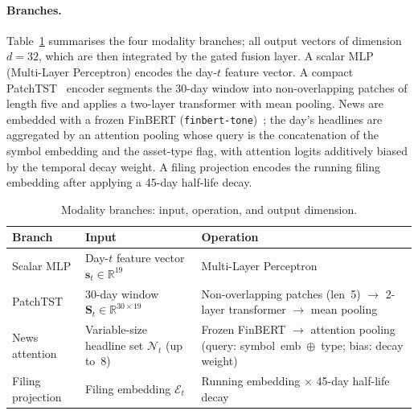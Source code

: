 \documentclass[runningheads]{llncs}
\begin{document}
\paragraph{Branches.}
Table~\ref{tab:branches} summarises the four modality branches; all output
vectors of dimension $d = 32$, which are then integrated by the gated fusion
layer. A scalar MLP (Multi-Layer Perceptron) encodes the day-$t$ feature
vector. A compact PatchTST~\cite{nie2023} encoder segments the 30-day window
into non-overlapping patches of length five and applies a two-layer transformer
with mean pooling. News are embedded with a frozen FinBERT
(\texttt{finbert-tone})~\cite{yang2020}; the day's headlines are aggregated by
an attention pooling whose query is the concatenation of the symbol embedding
and the asset-type flag, with attention logits additively biased by the
temporal decay weight. A filing projection encodes the running filing embedding
after applying a 45-day half-life decay.

\begin{table}[h]
\centering
\caption{Modality branches: input, operation, and output dimension.}
\label{tab:branches}
\small
\begin{tabular}{lll}
\toprule
Branch & Input & Operation \\
\midrule
Scalar MLP
  & Day-$t$ feature vector $\mathbf{s}_t \in \mathbb{R}^{19}$
  & Multi-Layer Perceptron \\
PatchTST
  & 30-day window $\mathbf{S}_t \in \mathbb{R}^{30 \times 19}$
  & Non-overlapping patches (len~5) $\to$ 2-layer transformer $\to$ mean pooling \\
News attention
  & Variable-size headline set $\mathcal{N}_t$ (up to~8)
  & Frozen FinBERT $\to$ attention pooling (query: symbol~emb~$\oplus$~type; bias: decay weight) \\
Filing projection
  & Filing embedding $\mathcal{E}_t$
  & Running embedding $\times$ 45-day half-life decay \\
\bottomrule
\end{tabular}
\end{table}
\end{document}
